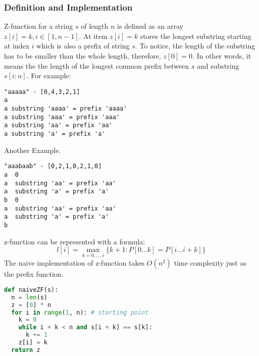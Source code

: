 \documentclass[../main.tex]{subfiles}
\begin{document}
\subsubsection{Definition and Implementation}
Z-function for a string $s$ of length $n$ is defined as an array $z[i] = k, i \in [1, n-1]$. At item $z[i]=k$ stores the longest substring starting at index $i$ which is also a prefix of string $s$. To notice, the length of the substring has to be smaller than the whole length, therefore, $z[0]=0$.  In other words, it means the  the length of the longest common prefix between $s$ and substring $s[i:n]$. %
For example:
\begin{lstlisting}[numbers=none]
"aaaaa" - [0,4,3,2,1]
a
a substring 'aaaa' = prefix 'aaaa'
a substring 'aaa' = prefix 'aaa'
a substring 'aa' = prefix 'aa'
a substring 'a' = prefix 'a'
\end{lstlisting}
Another Example.
\begin{lstlisting}[numbers=none]
"aaabaab" - [0,2,1,0,2,1,0]
a  0 
a  substring 'aa' = prefix 'aa'
a  substring 'a' = prefix 'a'
b  0
a  substring 'aa' = prefix 'aa'
a  substring 'a' = prefix 'a'
b  
\end{lstlisting}
z-function can be represented with a formula:
\begin{equation}
    l[i] = \max_{k=0,...,i}\{k+1: P[0...k] = P[i...i+k]\}
\end{equation}
The naive implementation of  z-function takes $O(n^2)$ time complexity just as the prefix function. 
\begin{lstlisting}[language=Python]
def naiveZF(s):
  n = len(s)
  z = [0] * n
  for i in range(1, n): # starting point
    k = 0
    while i + k < n and s[i + k] == s[k]:
      k += 1
    z[i] = k
  return z
\end{lstlisting}
\end{document}
